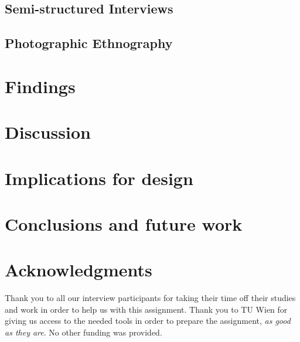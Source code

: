 \documentclass{sigchi}
\begin{document}
\subsection{Semi-structured Interviews}


\subsection{Photographic Ethnography}


\section{Findings}

\section{Discussion}


\section{Implications for design}


\section{Conclusions and future work}


\section{Acknowledgments}
Thank you to all our interview participants for taking their time off their studies and work in order to help us with this assignment. Thank you to TU Wien for giving us access to the needed tools in order to prepare the assignment,  \textit{as good as they are}. No other funding was provided.



\end{document}
